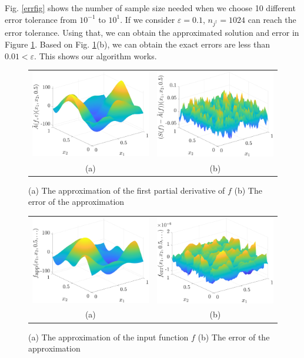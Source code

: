 \documentclass[graybox,footinfo]{svmult}
\begin{document}
Fig. \ref{errfig} shows the number of sample size needed when we choose 10 different error tolerance from $10^{-1}$ to $10^{1}$. If we consider $\varepsilon = 0.1$, $ n_{j^\dagger} = 1024$ can reach the error tolerance. Using that, we can obtain the approximated solution and error in Figure \ref{solfig}. Based on Fig. \ref{solfig}(b), we can obtain the exact errors are less than $0.01 < \varepsilon $.  This shows our algorithm works.


\begin{figure}[ht]
	\centering
	\begin{tabular}{cc}
		\includegraphics[width =5.5 cm]{ProgramsImages/SimDirectSolAppx.eps} &
		\includegraphics[width = 5.5 cm]{ProgramsImages/SimDirectSolErr.eps}
		\\ (a) & (b)
	\end{tabular}
	\caption{(a) The approximation of the first partial derivative of $f$
		(b) The error of the approximation 
		\label{solfig}} %
\end{figure}

\begin{figure}[ht]
	\centering
	\begin{tabular}{cc}
		\includegraphics[width = 5.5 cm]{ProgramsImages/SimDirectInpFunAppx.eps}& 
		\includegraphics[width = 5.5 cm]{ProgramsImages/SimDirectInpFunErr.eps}
		\\ (a) & (b)
	\end{tabular}
	\caption{(a) The approximation of the input function $f$
		(b) The error of the approximation 
		\label{inpfig}} %
\end{figure}
\end{document}
